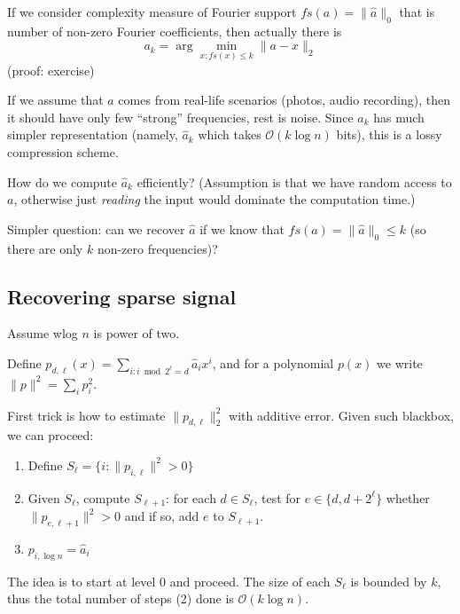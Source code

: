 \documentclass[11pt]{article}
\newcommand{\bigo}{\mathcal{O}}
\begin{document}
If we consider complexity measure of Fourier support $fs(a) = \|\hat{a}\|_0$ that is number of non-zero Fourier coefficients, then actually there is
$$ a_k = \arg \min_{x : fs(x) \le k} \|a - x\|_2$$
(proof: exercise)

If we assume that $a$ comes from real-life scenarios (photos, audio recording), then it should have only few ``strong'' frequencies, rest is noise. Since $a_k$ has much simpler representation (namely, $\hat{a}_k$ which takes $\bigo(k \log n)$ bits), this is a lossy compression scheme.

How do we compute $\hat{a}_k$ efficiently? (Assumption is that we have random access to $a$, otherwise just \emph{reading} the input would dominate the computation time.)

Simpler question: can we recover $\hat{a}$ if we know that $fs(a) = \|\hat{a}\|_0 \le k$ (so there are only $k$ non-zero frequencies)?

\subsection{Recovering sparse signal}
Assume wlog $n$ is power of two.

Define $p_{d,\ell}(x) = \sum_{i : i \bmod 2^{\ell} = d} \hat{a}_i x^i$, and for a polynomial $p(x)$ we write $\|p\|^2 = \sum_i p_i^2$.

First trick is how to estimate $\|p_{d,\ell}\|_2^2$ with additive error. Given such blackbox, we can proceed:
\begin{enumerate}
\item Define $S_{\ell} = \{i : \|p_{i,\ell}\|^2 > 0 \}$
\item Given $S_{\ell}$, compute $S_{\ell+1}$: for each $d \in S_{\ell}$, test for $e \in \{d, d+2^{\ell}\}$ whether $\|p_{e,\ell+1}\|^2 > 0$ and if so, add $e$ to $S_{\ell+1}$.
\item $p_{i,\log n} = \hat{a}_i$
\end{enumerate}

The idea is to start at level 0 and proceed. The size of each $S_{\ell}$ is bounded by $k$, thus the total number of steps (2) done is $\bigo(k \log n)$.
\end{document}
